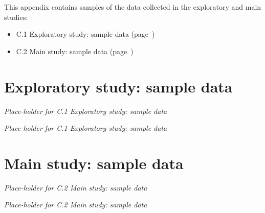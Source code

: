 
This appendix contains samples of the data collected in the exploratory and main studies:

\begin{itemize}
\item C.1 Exploratory study: sample data (page~\pageref{chap:appendices--study-data:exp-study})
\item C.2 Main study: sample data (page~\pageref{chap:appendices--study-data:main-study})
\end{itemize}


\newpage
\section{Exploratory study: sample data}
\label{chap:appendices--study-data:exp-study}
\Huge
\textit{Place-holder for C.1 Exploratory study: sample data}
\normalsize

\newpage
\Huge
\textit{Place-holder for C.1 Exploratory study: sample data}
\normalsize

\newpage
\section{Main study: sample data}
\label{chap:appendices--study-data:main-study}
\Huge
\textit{Place-holder for C.2 Main study: sample data}
\normalsize



\newpage
\Huge
\textit{Place-holder for C.2 Main study: sample data}
\normalsize






